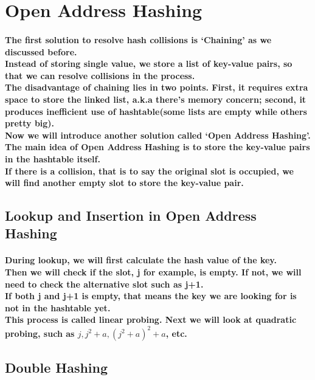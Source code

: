 \documentclass{article}
\begin{document}
\section{Open Address Hashing}

\paragraph{The first solution to resolve hash collisions is `Chaining' as we discussed before.\\
Instead of storing single value, we store a list of key-value pairs, so that we can resolve collisions
in the process.\\
The disadvantage of chaining lies in two points. First, it requires extra space to store the 
linked list, a.k.a there's memory concern; second, it produces inefficient use of hashtable(some lists 
are empty while others pretty big).\\
Now we will introduce another solution called `Open Address Hashing'.\\
The main idea of Open Address Hashing is to store the key-value pairs in the hashtable itself.\\
If there is a collision, that is to say the original slot is occupied, we will find another 
empty slot to store the key-value pair.\\}

\subsection{Lookup and Insertion in Open Address Hashing}

\paragraph{During lookup, we will first calculate the hash value of the key.\\
Then we will check if the slot, j for example, is empty. If not, we will need to check the 
alternative slot such as j+1.\\
If both j and j+1 is empty, that means the key we are looking for is not in the hashtable yet.\\
This process is called linear probing. Next we will look at quadratic probing, such as $j, j^2+a,
 (j^2+a)^2 +a$, etc.\\}

 \subsection{Double Hashing}
\end{document}
